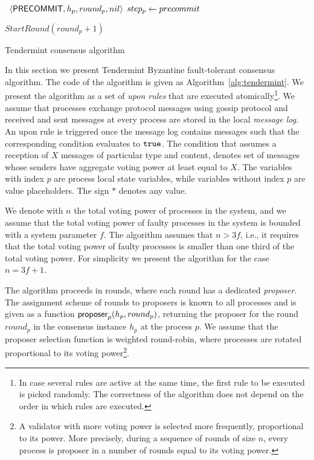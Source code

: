 \begin{algorithm}[htb!]
\begin{algorithmic}[1]
\SHORTSPACE
{} \label{line:tab:onTimeoutPrevote}
\STATE \Broadcast \ $\langle\mathsf{PRECOMMIT},h_p,round_p,nil\rangle$   \label{line:tab:precommit-nil-onTimeout}
\STATE $step_p \leftarrow precommit$
\ENDIF	
\ENDFUNCTION

\SHORTSPACE
{} \label{line:tab:onTimeoutPrecommit}
\STATE $StartRound(round_p + 1)$ \label{line:tab:nextRound} 
\ENDIF	
\ENDFUNCTION	
\end{algorithmic}
\caption{Tendermint consensus algorithm}
\label{alg:tendermint}
\end{algorithm}

In this section we present Tendermint Byzantine fault-tolerant consensus algorithm. 
The code of the algorithm is given as Algorithm~\ref{alg:tendermint}. We present the algorithm as a set of \emph{upon rules} that are executed atomically\footnote{In case several rules are active at the same time, the first rule to be executed is picked randomly. The correctness of the algorithm does not depend on the order in which rules are executed.}. We assume that processes exchange protocol messages using gossip protocol and received and sent messages at every process are stored in the local \emph{message log}. An upon rule is triggered once the message log contains messages such that the corresponding condition evaluates to $\tt{true}$. The condition that assumes a reception of $X$ messages of particular type and content, denotes set of messages whose senders have aggregate voting power at least equal to $X$. The variables with index $p$ are process local state variables, while variables without index $p$ are value placeholders. The sign $*$ denotes any value.    

We denote with $n$ the total voting power of processes in the system, and we assume that the total voting power of faulty processes in the system is bounded with a system parameter $f$. 
The algorithm assumes that $n > 3f$, i.e., it requires that the total voting power of faulty processes is smaller than one third of the total voting power. For simplicity we present the algorithm for the case $n = 3f + 1$.

The algorithm proceeds in rounds, where each round has a dedicated \emph{proposer}. The assignment scheme of rounds to proposers is known to all processes and is given as a function $\mathsf{proposer}_p(h_p, round_p)$, returning the proposer for the round $round_p$ in the consensus instance $h_p$ at the process $p$. We assume that the proposer selection function is weighted round-robin, where processes are rotated proportional to its voting power\footnote{A validator with more voting power is selected more frequently, proportional to its power. More precisely, during a sequence of rounds of size $n$, every process is proposer in a number of rounds equal to its voting power.}. 

